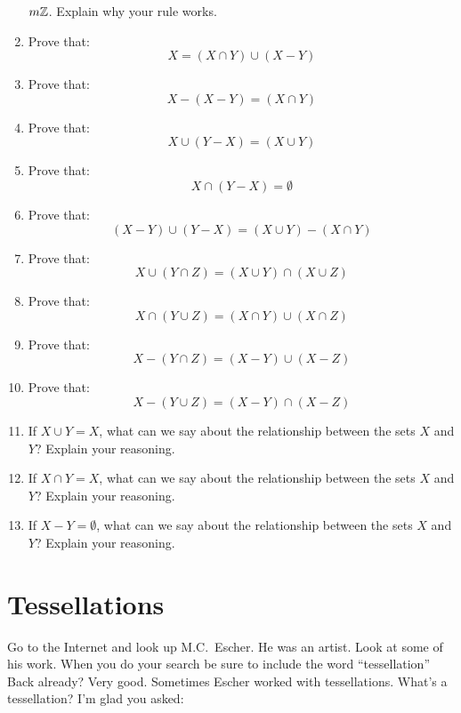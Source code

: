\begin{problems}
\begin{enumerate}
  $m\mathbb Z$. Explain why your rule works.
\item Prove that:
\[
X = (X\cap Y) \cup (X-Y)
\]
\item Prove that:
\[
X-(X-Y) = (X\cap Y)
\]
\item Prove that:
\[
X \cup (Y-X) = (X\cup Y)
\]
\item Prove that:
\[
X \cap (Y-X) = \emptyset
\]
\item Prove that:
\[
(X-Y)\cup (Y-X) = (X\cup Y)-(X\cap Y)
\]
\item Prove that:
\[
X\cup (Y \cap Z) = (X \cup Y)\cap (X \cup Z)
\]
\item Prove that:
\[
X\cap (Y \cup Z) = (X \cap Y)\cup (X \cap Z)
\]
\item Prove that:
\[
X - (Y \cap Z) = (X -Y)\cup (X - Z)
\]
\item Prove that:
\[
X - (Y \cup Z) = (X -Y)\cap (X -Z)
\]
\item If $X\cup Y = X$, what can we say about the relationship between the sets $X$ and $Y$? Explain your reasoning.
\item If $X\cap Y = X$, what can we say about the relationship between the sets $X$ and $Y$? Explain your reasoning.
\item If $X-Y =\emptyset$, what can we say about the relationship between the sets $X$ and $Y$? Explain your reasoning.
\end{enumerate}
\end{problems}


\newpage



\section{Tessellations}

Go to the Internet and look up M.C.\ Escher. He
was an artist. Look at some of his work. When you do your search be
sure to include the word ``tessellation'' Back already? Very
good. Sometimes Escher worked with tessellations. What's a
tessellation? I'm glad you asked:

